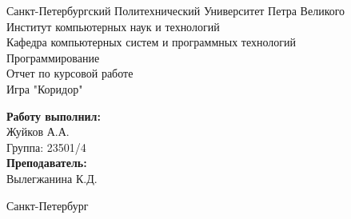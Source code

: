 \documentclass[a4paper]{article}
\begin{document}


\begin{titlepage}	%

	\begin{center}		%

		\large Санкт-Петербургский Политехнический Университет Петра Великого\\
		\large Институт компьютерных наук и технологий \\
		\large Кафедра компьютерных систем и программных технологий\\[6cm]
		
		\huge Программирование\\[0.5cm] %
		\large Отчет по курсовой работе\\[0.1cm]
		\large Игра "Коридор"\\[5cm]

	\end{center}


	\begin{flushright} %
		\begin{minipage}{0.25\textwidth} %
			\begin{flushleft} %

				\large\textbf{Работу выполнил:}\\
				\large Жуйков А.А.\\
				\large {Группа:} 23501/4\\
				
				\large \textbf{Преподаватель:}\\
				\large Вылегжанина К.Д.
				

			\end{flushleft}
		\end{minipage}
	\end{flushright}
	
	\vfill %

	\begin{center}
	\large Санкт-Петербург\\
	\large \the\year %
	\end{center} %

\thispagestyle{empty} %
\end{titlepage} %
\end{document}
